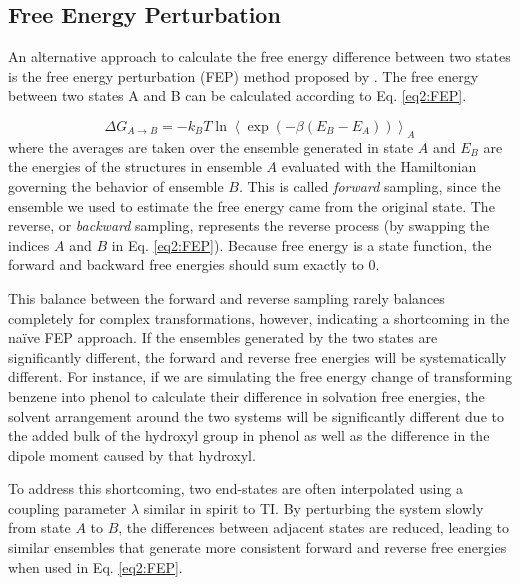 \subsection{Free Energy Perturbation}

An alternative approach to calculate the free energy difference between two
states is the free energy perturbation (FEP) method proposed by
\citeauthor{Zwanzig_JChemPhys_1954_v22_p1420}.
\cite{Zwanzig_JChemPhys_1954_v22_p1420} The free energy between two states A and
B can be calculated according to Eq. \ref{eq2:FEP}.

\begin{equation}
   \Delta G _ {A \rightarrow B} = -k_B T \ln \left \langle \exp \left( - \beta
         (E_B - E_A) \right) \right \rangle _ A
   \label{eq2:FEP}
\end{equation}
where the averages are taken over the ensemble generated in state $A$ and $E_B$
are the energies of the structures in ensemble $A$ evaluated with the
Hamiltonian governing the behavior of ensemble $B$. This is called
\emph{forward} sampling, since the ensemble we used to estimate the free energy
came from the original state. \cite{Leach_Book_MolModel_2001} The reverse, or
\emph{backward} sampling, represents the reverse process (\ie by swapping the
indices $A$ and $B$ in Eq. \ref{eq2:FEP}). Because free energy is a state
function, the forward and backward free energies should sum exactly to 0.

This balance between the forward and reverse sampling rarely balances completely
for complex transformations, however, indicating a shortcoming in the na\"ive
FEP approach. If the ensembles generated by the two states are significantly
different, the forward and reverse free energies will be systematically
different. For instance, if we are simulating the free energy change of
transforming benzene into phenol to calculate their difference in solvation free
energies, the solvent arrangement around the two systems will be significantly
different due to the added bulk of the hydroxyl group in phenol as well as the
difference in the dipole moment caused by that hydroxyl.

To address this shortcoming, two end-states are often interpolated using a
coupling parameter $\lambda$ similar in spirit to TI. By perturbing the system
slowly from state $A$ to $B$, the differences between adjacent states are
reduced, leading to similar ensembles that generate more consistent forward and
reverse free energies when used in Eq. \ref{eq2:FEP}.
\cite{Leach_Book_MolModel_2001}

